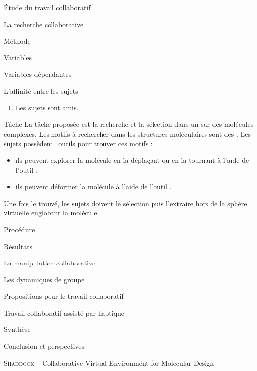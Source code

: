 \documentclass[myfrancais]{mythesis}
\begin{document}
\begin{mypart}{Étude du travail collaboratif}
\begin{mychapter}{La recherche collaborative}
\begin{mysection}{Méthode}
\begin{mysubsection}{Variables}
\begin{mysubsubsection}{Variables dépendantes}
\begin{myparagraph}{ L'affinité entre les sujets}
\begin{enumerate}
								\item Les sujets sont amis.
							\end{enumerate}
						\end{myparagraph}
					\end{mysubsubsection}
				\end{mysubsection}
				\begin{mysubsection}{Tâche}
					La tâche proposée est la recherche et la sélection dans un  sur des molécules complexes.
					Les motifs à rechercher dans les structures moléculaires sont des  .
					Les sujets possèdent ~outils pour trouver ces motifs :
					\begin{itemize}
						\item ils peuvent explorer la molécule en la déplaçant ou en la tournant à l'aide de l'outil ;
						\item ils peuvent déformer la molécule à l'aide de l'outil .
					\end{itemize}

					Une fois le  trouvé, les sujets doivent le sélection puis l'extraire hors de la sphère virtuelle englobant la molécule.
				\end{mysubsection}
				\begin{mysubsection}{Procédure}
				\end{mysubsection}
			\end{mysection}
			\begin{mysection}{Résultats}
			\end{mysection}
		\end{mychapter}
		\begin{mychapter}{La manipulation collaborative}
		\end{mychapter}
		\begin{mychapter}{Les dynamiques de groupe}
		\end{mychapter}
	\end{mypart}
	\begin{mypart}{Propositions pour le travail collaboratif}
		\begin{mychapter}{Travail collaboratif assisté par haptique}
		\end{mychapter}
	\end{mypart}
	\begin{mypart}{Synthèse}
		\begin{mychapter}{Conclusion et perspectives}
		\end{mychapter}
	\end{mypart}

	\myglossary
	\appendix
	\begin{mychapter}{\textsc{Shaddock} -- Collaborative Virtual Environment for Molecular Design}
	\end{mychapter}
\end{document}
